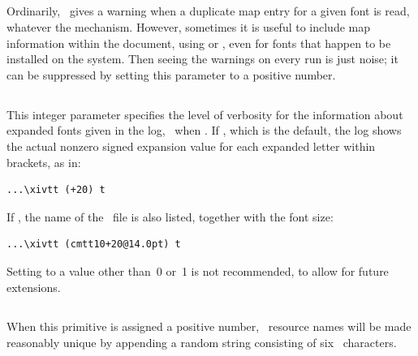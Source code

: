 \documentclass{pdftexmanual}
\begin{document}
\subsection{}

Ordinarily, \PDFTEX\ gives a warning when a duplicate map entry for a
given font is read, whatever the mechanism. However, sometimes it is
useful to include map information within the document, using
 or , even for fonts that happen to be
installed on the system. Then seeing the warnings on every run is just
noise; it can be suppressed by setting this parameter to a positive
number. 

\subsection{}

This integer parameter specifies the level of verbosity for the
information about expanded fonts given in the log, \eg\ when
. If , which is the default,
the log shows the actual nonzero signed expansion value for each
expanded letter within brackets, as in:

\begin{verbatim}
...\xivtt (+20) t
\end{verbatim}

If , the name of the \TFM\ file is also listed,
together with the font size:

\begin{verbatim}
...\xivtt (cmtt10+20@14.0pt) t
\end{verbatim}

Setting  to a value other than~0 or~1 is not
recommended, to allow for future extensions.  

\subsection{}

When this primitive is assigned a positive number, \PDF\ resource names
will be made reasonably unique by appending a random string consisting
of six \ASCII\ characters.
\end{document}
